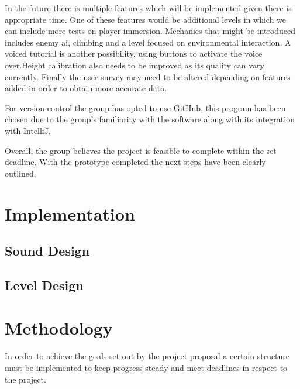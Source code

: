In the future there is multiple features which will be implemented given there is appropriate time. One of these features would be additional levels in which we can include more tests on player immersion. Mechanics that might be introduced includes enemy ai, climbing and a level focused on environmental interaction. A voiced tutorial is another possibility, using buttons to activate the voice over.Height calibration also needs to be improved as its quality can vary currently. Finally the user survey may need to be altered depending on features added in order to obtain more accurate data.

For version control the group has opted to use GitHub, this program has been chosen due to the group's familiarity with the software along with its integration with IntelliJ.

Overall, the group believes the project is feasible to complete within the set deadline. With the prototype completed the next steps have been clearly outlined. 


\chapter{Implementation}

\section{Sound Design}

\section{Level Design}





\chapter{Methodology}

In order to achieve the goals set out by the project proposal a certain structure must be implemented to keep progress steady and meet deadlines in respect to the project. 

